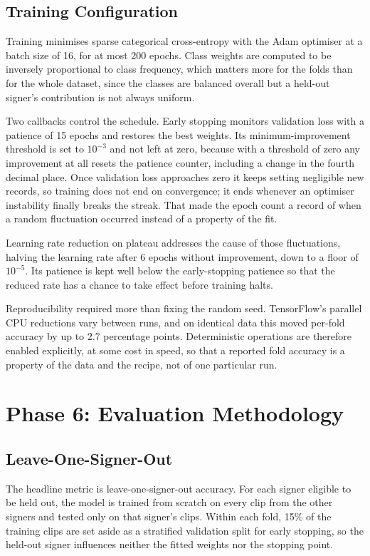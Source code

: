 \subsection{Training Configuration}

Training minimises sparse categorical cross-entropy with the Adam optimiser \cite{kingma2015adam} at a batch size of 16, for at most 200 epochs. Class weights are computed to be inversely proportional to class frequency, which matters more for the folds than for the whole dataset, since the classes are balanced overall but a held-out signer's contribution is not always uniform.

Two callbacks control the schedule. Early stopping monitors validation loss with a patience of 15 epochs and restores the best weights. Its minimum-improvement threshold is set to $10^{-3}$ and not left at zero, because with a threshold of zero any improvement at all resets the patience counter, including a change in the fourth decimal place. Once validation loss approaches zero it keeps setting negligible new records, so training does not end on convergence; it ends whenever an optimiser instability finally breaks the streak. That made the epoch count a record of when a random fluctuation occurred instead of a property of the fit.

Learning rate reduction on plateau addresses the cause of those fluctuations, halving the learning rate after 6 epochs without improvement, down to a floor of $10^{-5}$. Its patience is kept well below the early-stopping patience so that the reduced rate has a chance to take effect before training halts.

Reproducibility required more than fixing the random seed. TensorFlow's parallel CPU reductions vary between runs, and on identical data this moved per-fold accuracy by up to 2.7 percentage points. Deterministic operations are therefore enabled explicitly, at some cost in speed, so that a reported fold accuracy is a property of the data and the recipe, not of one particular run.

\section{Phase 6: Evaluation Methodology}

\subsection{Leave-One-Signer-Out}

The headline metric is leave-one-signer-out accuracy. For each signer eligible to be held out, the model is trained from scratch on every clip from the other signers and tested only on that signer's clips. Within each fold, 15\% of the training clips are set aside as a stratified validation split for early stopping, so the held-out signer influences neither the fitted weights nor the stopping point.

